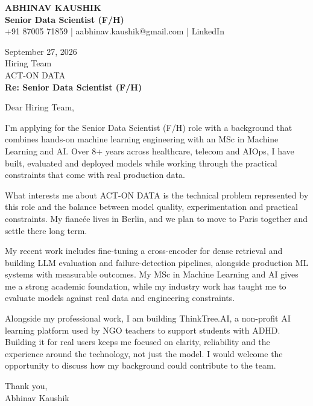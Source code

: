 \documentclass[10pt,a4paper]{article}
\begin{document}
\begin{center}
{\Large\bfseries ABHINAV KAUSHIK}\\[2pt]
{\bfseries Senior Data Scientist (F/H)}\\[2pt]
+91 87005 71859 \quad | \quad aabhinav.kaushik@gmail.com \quad | \quad LinkedIn
\end{center}
\vspace{8pt}
September 27, 2026\\[6pt]
Hiring Team\\
ACT-ON DATA\\[4pt]
\textbf{Re: Senior Data Scientist (F/H)}

Dear Hiring Team,

I’m applying for the Senior Data Scientist (F/H) role with a background that combines hands-on machine learning engineering with an MSc in Machine Learning and AI. Over 8+ years across healthcare, telecom and AIOps, I have built, evaluated and deployed models while working through the practical constraints that come with real production data.

What interests me about ACT-ON DATA is the technical problem represented by this role and the balance between model quality, experimentation and practical constraints. My fiancée lives in Berlin, and we plan to move to Paris together and settle there long term.

My recent work includes fine-tuning a cross-encoder for dense retrieval and building LLM evaluation and failure-detection pipelines, alongside production ML systems with measurable outcomes. My MSc in Machine Learning and AI gives me a strong academic foundation, while my industry work has taught me to evaluate models against real data and engineering constraints.

Alongside my professional work, I am building ThinkTree.AI, a non-profit AI learning platform used by NGO teachers to support students with ADHD. Building it for real users keeps me focused on clarity, reliability and the experience around the technology, not just the model. I would welcome the opportunity to discuss how my background could contribute to the team.

Thank you,\\
Abhinav Kaushik
\end{document}

